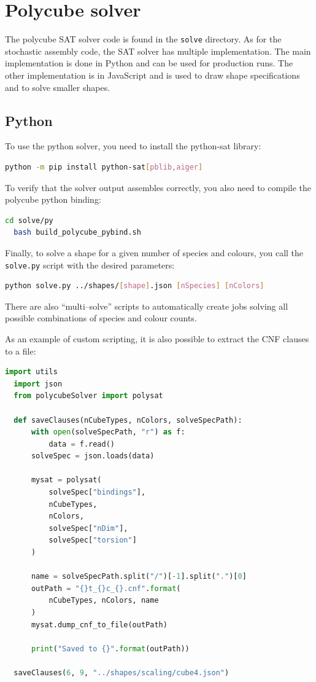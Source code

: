\section{Polycube solver}

The polycube SAT solver code is found in the \texttt{solve} directory. As for the stochastic assembly code, the SAT solver has multiple implementation. The main implementation is done in Python and can be used for production runs. The other implementation is in JavaScript and is used to draw shape specifications and to solve smaller shapes.

\subsection{Python}

To use the python solver, you need to install the python-sat library:

\begin{lstlisting}[language=bash]
  python -m pip install python-sat[pblib,aiger]
\end{lstlisting}

To verify that the solver output assembles correctly, you also need to compile the polycube python binding:

\begin{lstlisting}[language=bash]
  cd solve/py
  bash build_polycube_pybind.sh
\end{lstlisting}

Finally, to solve a shape for a given number of species and colours, you call the \texttt{solve.py} script with the desired parameters:

\begin{lstlisting}[language=bash]
  python solve.py ../shapes/[shape].json [nSpecies] [nColors]
\end{lstlisting}

There are also ``multi--solve'' scripts to automatically create jobs solving all possible combinations of species and colour counts.

As an example of custom scripting, it is also possible to extract the CNF clauses to a file:

\begin{lstlisting}[language=python]
  import utils
  import json
  from polycubeSolver import polysat

  def saveClauses(nCubeTypes, nColors, solveSpecPath):
      with open(solveSpecPath, "r") as f:
          data = f.read()
      solveSpec = json.loads(data)

      mysat = polysat(
          solveSpec["bindings"],
          nCubeTypes,
          nColors,
          solveSpec["nDim"],
          solveSpec["torsion"]
      )

      name = solveSpecPath.split("/")[-1].split(".")[0]
      outPath = "{}t_{}c_{}.cnf".format(
          nCubeTypes, nColors, name
      )
      mysat.dump_cnf_to_file(outPath)

      print("Saved to {}".format(outPath))

  saveClauses(6, 9, "../shapes/scaling/cube4.json")
\end{lstlisting}

